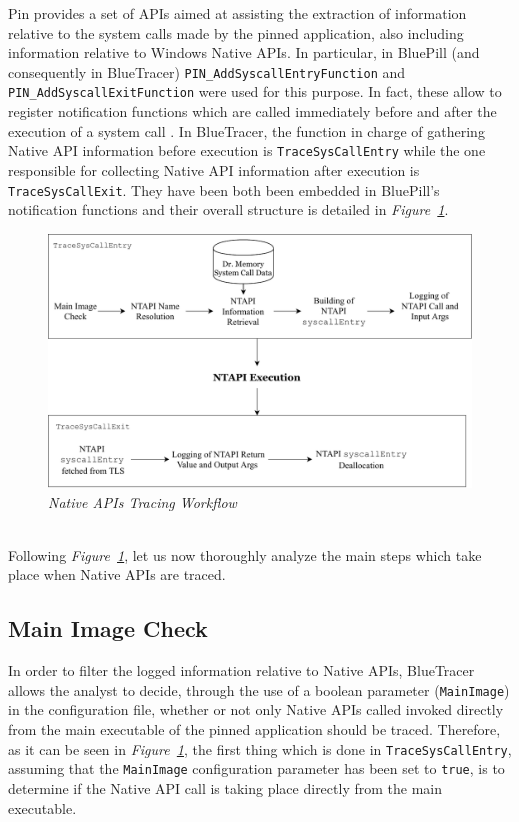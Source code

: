 Pin provides a set of APIs aimed at assisting the extraction of information relative to the system calls made by the pinned application, also including information relative to Windows Native APIs. In particular, in BluePill (and consequently in BlueTracer) \texttt{PIN\_AddSyscallEntryFunction} and  \texttt{PIN\_AddSyscallExitFunction} were used for this purpose. In fact, these allow to register notification functions which are called immediately before and after the execution of a system call \cite{Pin}. In BlueTracer, the function in charge of gathering Native API information before execution is \texttt{TraceSysCallEntry} while the one responsible for collecting Native API information after execution is \texttt{TraceSysCallExit}. They have been both been embedded in BluePill's notification functions and their overall structure is detailed in \textit{Figure~\ref{NTAPI Tracing}}.
\\
\begin{figure}[h]
\centering
\includegraphics[scale=0.75]{Figures/NTAPITracing.pdf}
\caption{\textit{Native APIs Tracing Workflow}}
\label{NTAPI Tracing}
\end{figure}
\\
Following \textit{Figure~\ref{NTAPI Tracing}}, let us now thoroughly analyze the main steps which take place when Native APIs are traced.

\subsection{Main Image Check}
In order to filter the logged information relative to Native APIs, BlueTracer allows the analyst to decide, through the use of a boolean parameter (\texttt{MainImage}) in the configuration file, whether or not only Native APIs called invoked directly from the main executable of the pinned application should be traced. Therefore, as it can be seen in \textit{Figure~\ref{NTAPI Tracing}}, the first thing which is done in \texttt{TraceSysCallEntry}, assuming that the \texttt{MainImage} configuration parameter has been set to \texttt{true}, is to determine if the Native API call is taking place directly from the main executable.

